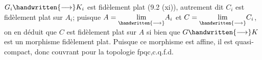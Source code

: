 
$G_i\handwritten{\longrightarrow}K_i$ est fidèlement plat (9.2 (xi)), autrement dit $C_i$ est fidèlement plat sur $A_i$; puisque $A=\underset{\handwritten{\longrightarrow}}{\lim}A_i$ et $C=\underset{\handwritten{\longrightarrow}}{\lim}C_i$, on en déduit que $C$ est fidèlement plat sur $A$\handwritten{,} si bien que $G\handwritten{\longrightarrow}K$ est un morphisme fidèlement plat. Puisque ce morphisme est affine, il est quasi-compact, donc couvrant pour la topologie fpqc,c.q.f.d.

